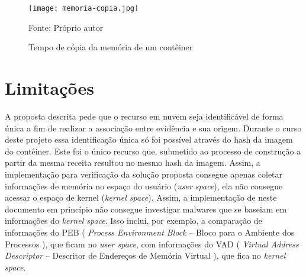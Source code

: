 
\begin{figure}[htb!]
\footnotesize
\caption{Tempo de cópia da memória de um contêiner}
\texttt{[image: memoria-copia.jpg]}
\centering
\label{fig:memoria-copia}
\begin{center}
Fonte: Próprio autor 
\end{center}
\end{figure}

\section{Limitações}
\label{sec:proposta-limit}

A proposta descrita pede que o recurso em nuvem seja identificável de forma única a fim de realizar a associação entre evidência e sua origem.
%
Durante o curso deste projeto essa identificação única só foi possível através do hash da imagem do contêiner. Este foi o único recurso que, submetido ao processo de construção a partir da mesma receita resultou no mesmo hash da imagem.
%
Assim, a implementação para verificação da solução proposta consegue apenas coletar informações de memória no espaço do usuário (\textit{user space}), ela não consegue acessar o espaço de kernel (\textit{kernel space}). 
%
Assim, a implementação de \fancyname neste documento em princípio não consegue investigar malwares que se baseiam em informações do \textit{kernel space}.
%
Isso inclui, por exemplo, a comparação de informações do PEB ( \textit{Process Environment Block} -- Bloco para o Ambiente dos Processos ), que ficam no \textit{user space}, com informações do VAD ( \textit{Virtual Address Descriptor} -- Descritor de Endereços de Memória Virtual ), que fica no \textit{kernel space}. 
%


